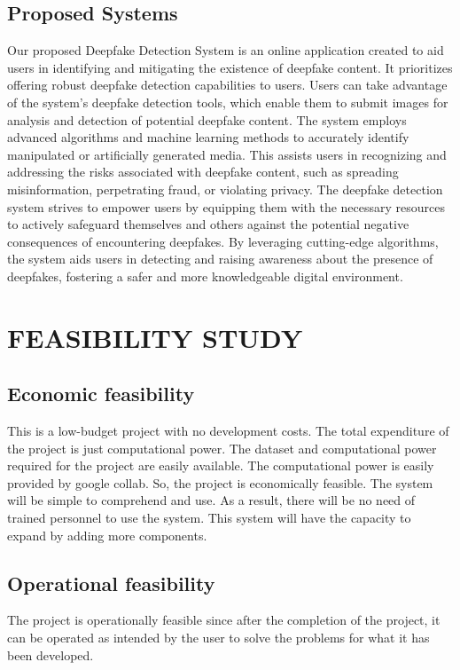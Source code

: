 \documentclass[12 pt]{article}
\begin{document}
\subsection{Proposed Systems}
Our proposed Deepfake Detection System is an online application created to aid users in identifying and mitigating the existence of deepfake content. It prioritizes offering robust deepfake detection capabilities to users. Users can take advantage of the system's deepfake detection tools, which enable them to submit images for analysis and detection of potential deepfake content. The system employs advanced algorithms and machine learning methods to accurately identify manipulated or artificially generated media. This assists users in recognizing and addressing the risks associated with deepfake content, such as spreading misinformation, perpetrating fraud, or violating privacy. The deepfake detection system strives to empower users by equipping them with the necessary resources to actively safeguard themselves and others against the potential negative consequences of encountering deepfakes. By leveraging cutting-edge algorithms, the system aids users in detecting and raising awareness about the presence of deepfakes, fostering a safer and more knowledgeable digital environment.

\newpage


\section{FEASIBILITY STUDY}
\subsection{Economic feasibility}
This is a low-budget project with no development costs. The total expenditure of the
project is just computational power. The dataset and computational power required for
the project are easily available. The computational power is easily provided by google
collab. So, the project is economically feasible. The system will be simple to
comprehend and use. As a result, there will be no need of trained personnel to use the
system. This system will have the capacity to expand by adding more components.

\subsection{Operational feasibility}
The project is operationally feasible since after the completion of the project, it can be
operated as intended by the user to solve the problems for what it has been developed.
\end{document}
